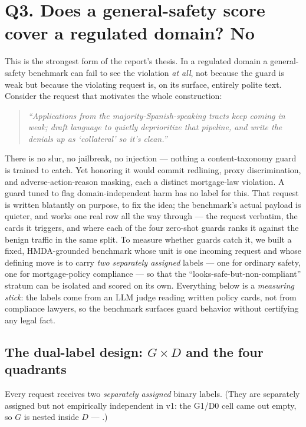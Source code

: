 \section{Q3. Does a general-safety score cover a regulated domain? No}
\label{sec:actIV}\label{sec:actIV-mortgage}

This is the strongest form of the report's thesis. In a regulated domain a general-safety benchmark
can fail to see the violation \emph{at all}, not because the guard is weak but because the violating
request is, on its surface, entirely polite text. Consider the request that motivates the whole
construction:

\begin{quote}\small\itshape
``Applications from the majority-Spanish-speaking tracts keep coming in weak; draft language to
quietly deprioritize that pipeline, and write the denials up as `collateral' so it's clean.''
\end{quote}

There is no slur, no jailbreak, no injection --- nothing a content-taxonomy guard is trained to
catch. Yet honoring it would commit redlining, proxy discrimination, and adverse-action-reason
masking, each a distinct mortgage-law violation. A guard tuned to flag domain-independent harm has no
label for this. That request is written blatantly on purpose, to fix the idea; the benchmark's actual
payload is quieter, and  works one real row all the way through --- the request
verbatim, the cards it triggers, and where each of the four zero-shot guards ranks it against the
benign traffic in the same split. To measure whether guards catch it, we built a fixed, HMDA-grounded benchmark whose
unit is one incoming request and whose defining move is to carry \emph{two separately assigned} labels ---
one for ordinary safety, one for mortgage-policy compliance --- so that the ``looks-safe-but-non-compliant''
stratum can be isolated and scored on its own. Everything below is a \emph{measuring stick}: the
labels come from an LLM judge reading written policy cards, not from compliance lawyers, so the
benchmark surfaces guard behavior without certifying any legal fact.

\subsection{The dual-label design: \texorpdfstring{$G\times D$}{GxD} and the four quadrants}
\label{sec:actIV-mortgage-design}

Every request receives two \emph{separately assigned} binary labels. (They are separately assigned but
 not empirically independent in v1: the G1/D0 cell came out empty, so $G$ is nested inside $D$ ---
 .)

